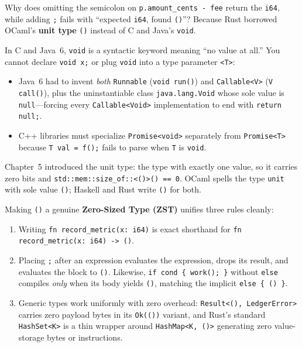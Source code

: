 Why does omitting the semicolon on \texttt{p.amount\_\allowbreak{}cents - fee} return
the \texttt{i64}, while adding \texttt{;} fails with ``expected \texttt{i64}, found
\texttt{()}''? Because Rust borrowed OCaml's \textbf{unit type} \texttt{()} instead of
C and Java's \texttt{void}.

In C and Java~6, \texttt{void} is a syntactic keyword meaning ``no value at all.'' You
cannot declare \texttt{void x;} or plug \texttt{void} into a type parameter \texttt{<T>}:
\begin{itemize}
  \item Java~6 had to invent \emph{both} \texttt{Runnable} (\texttt{void run()}) and
    \texttt{Callable<V>} (\texttt{V call()}), plus the uninstantiable class
    \texttt{java.lang.Void} whose sole value is \texttt{null}---forcing every
    \texttt{Callable<Void>} implementation to end with \texttt{return null;}.
  \item C++ libraries must specialize \texttt{Promise<void>} separately from
    \texttt{Promise<T>} because \texttt{T val = f();} fails to parse when \texttt{T}
    is \texttt{void}.
\end{itemize}

Chapter~5 introduced the unit type: the type with exactly one value, so it carries
zero bits and \texttt{std::mem::size\_of::<()>() == 0}. OCaml spells the type
\texttt{unit} with sole value \texttt{()}; Haskell and Rust write \texttt{()} for both.

Making \texttt{()} a genuine \textbf{Zero-Sized Type (ZST)} unifies three rules cleanly:
\begin{enumerate}
  \item Writing \texttt{fn record\_metric(x: i64)} is exact shorthand for
    \texttt{fn record\_metric(x: i64) -> ()}.
  \item Placing \texttt{;} after an expression evaluates the expression, drops its
    result, and evaluates the block to \texttt{()}. Likewise, \texttt{if cond \{ work(); \}}
    without \texttt{else} compiles \emph{only} when its body yields \texttt{()},
    matching the implicit \texttt{else \{ () \}}.
  \item Generic types work uniformly with zero overhead: \texttt{Result<(), LedgerError>}
    carries zero payload bytes in its \texttt{Ok(())} variant, and Rust's standard
    \texttt{HashSet<K>} is a thin wrapper around \texttt{HashMap<K, ()>}
    generating zero value-storage bytes or instructions.
\end{enumerate}

